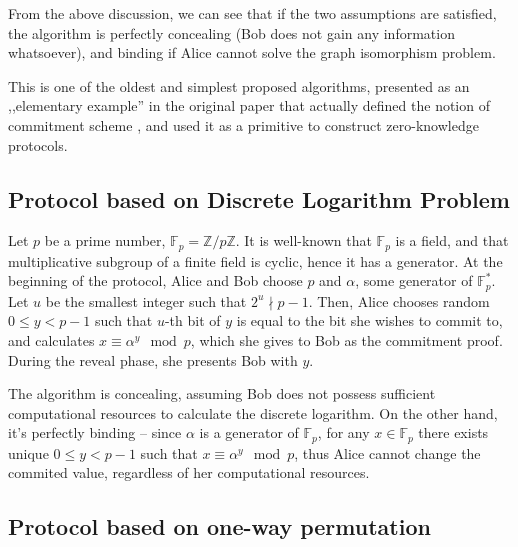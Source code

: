 \documentclass[10pt]{article}
\begin{document}
From the above discussion, we can see that if the two assumptions are satisfied, the algorithm is
perfectly concealing (Bob does not gain any information whatsoever), and binding if Alice cannot solve
the graph isomorphism problem.

This is one of the oldest and simplest proposed algorithms, presented as an ,,elementary example'' 
in the original paper that actually defined the notion of commitment scheme \cite{Brassard88}, and 
used it as a primitive to construct zero-knowledge protocols.

\subsection{Protocol based on Discrete Logarithm Problem}

Let \(p\) be a prime number, \(\mathbb{F}_p=\mathbb{Z}/p\mathbb{Z}\). It is well-known that 
\(\mathbb{F}_p\) is a field, and that multiplicative subgroup of a finite field is cyclic, hence it
has a generator. At the beginning of the protocol, Alice and Bob choose \(p\) and \(\alpha\), some
generator of \(\mathbb{F}^*_p\). Let \(u\) be the smallest integer such that \(2^u \nmid p-1\). 
Then, Alice chooses random \(0\leq y < p-1\) such that \(u\)-th bit of \(y\) is equal to the bit
she wishes to commit to\footnotemark, and calculates \(x\equiv \alpha^y \mod p\), which she gives
to Bob as the commitment proof. During the reveal phase, she presents Bob with \(y\).

The algorithm is concealing, assuming Bob does not possess sufficient computational resources to
calculate the discrete logarithm. On the other hand, it's perfectly binding -- since \(\alpha\) is
a generator of \(\mathbb{F}_p\), for any \(x\in\mathbb{F}_p\) there exists unique \(0\leq y < p-1\)
such that \(x\equiv \alpha^y \mod p\), thus Alice cannot change the commited value, regardless
of her computational resources.




\subsection{Protocol based on one-way permutation} 
\end{document}
